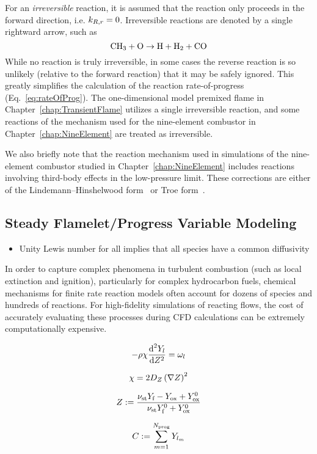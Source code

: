For an \textit{irreversible} reaction, it is assumed that the reaction only proceeds in the forward direction, i.e. $k_{R,r} = 0$. Irreversible reactions are denoted by a single rightward arrow, such as
%
\begin{equation}
	\text{CH}_3 + \text{O} \rightarrow \text{H} + \text{H}_2 + \text{CO}
\end{equation}
%
While no reaction is truly irreversible, in some cases the reverse reaction is so unlikely (relative to the forward reaction) that it may be safely ignored. This greatly simplifies the calculation of the reaction rate-of-progress (Eq.~\ref{eq:rateOfProg}). The one-dimensional model premixed flame in Chapter~\ref{chap:TransientFlame} utilizes a single irreversible reaction, and some reactions of the mechanism used for the nine-element combustor in Chapter~\ref{chap:NineElement} are treated as irreversible.

We also briefly note that the reaction mechanism used in simulations of the nine-element combustor studied in Chapter~\ref{chap:NineElement} includes reactions involving third-body effects in the low-pressure limit. These corrections are either of the Lindemann--Hinshelwood form~\cite{Hinshelwood1926} or Troe form~\cite{Gilbert1983}.

\subsection{Steady Flamelet/Progress Variable Modeling}\label{sec:fpv}

{\color{red}
\begin{itemize}
	\item Unity Lewis number for all implies that all species have a common diffusivity
\end{itemize}
}
In order to capture complex phenomena in turbulent combustion (such as local extinction and ignition), particularly for complex hydrocarbon fuels, chemical mechanisms for finite rate reaction models often account for dozens of species and hundreds of reactions. For high-fidelity simulations of reacting flows, the cost of accurately evaluating these processes during CFD calculations can be extremely computationally expensive.

\begin{equation}
	-\rho \chi \frac{\text{d} ^2 Y_{l}}{\text{d} Z^2} = \omega_{l}
\end{equation}

\begin{equation}
	\chi = 2 D_{Z} \left(\nabla Z\right)^2
\end{equation}

\begin{equation}\label{eq:mixFracDef}
    Z := \frac{ \nu_{\text{st}} Y_{\text{f}} - Y_{\text{ox}} + Y^0_{\text{ox}} }{ \nu_{\text{st}} Y^0_{\text{f}} + Y^0_{\text{ox}} }
\end{equation}

\begin{equation}\label{eq:progVarDef}
	C := \sum_{m = 1}^{N_{\text{prog}}} Y_{l_{m}}
\end{equation}
